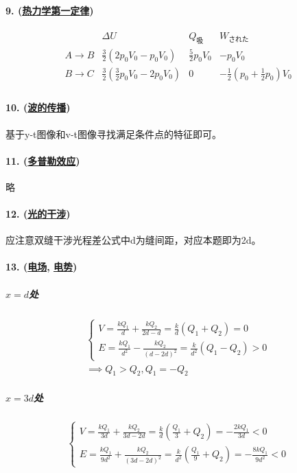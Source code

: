 \paragraph{9. (\hyperref[subsec:热力学第一定律]{热力学第一定律})}

\begin{equation*}
    \begin{array}{c|ccc}
        & \Delta U & Q_\textrm{吸} & W_\textrm{された} \\\hline
        A\to B & \frac32(2p_0V_0-p_0V_0) & \frac52p_0V_0 & -p_0V_0 \\
        B\to C & \frac32(\frac32p_0V_0-2p_0V_0) & 0 & -\frac12(p_0+\frac12p_0)V_0 \\
    \end{array}
\end{equation*}

\paragraph{10. (\hyperref[subsec:波的传播]{波的传播})} 基于y-t图像和v-t图像寻找满足条件点的特征即可。
\paragraph{11. (\hyperref[subsec:多普勒效应]{多普勒效应})} 略
\paragraph{12. (\hyperref[subsec:光的干涉]{光的干涉})} 应注意双缝干涉光程差公式中d为缝间距，对应本题即为2d。
\paragraph{13. (\hyperref[subsec:电场]{电场}, \hyperref[subsec:电势]{电势})}

\subparagraph{$x=d$处}

\begin{gather*}
    \begin{cases}
        V=\frac{kQ_1}{d}+\frac{kQ_2}{2d-d}=\frac{k}{d}(Q_1+Q_2)=0\\
        E=\frac{kQ_1}{d^2}-\frac{kQ_2}{(d-2d)^2}=\frac{k}{d^2}(Q_1-Q_2)>0
    \end{cases}\\\implies
    Q_1>Q_2,Q_1=-Q_2
\end{gather*}

\subparagraph{$x=3d$处}

\begin{equation*}
    \begin{cases}
        V=\frac{kQ_1}{3d}+\frac{kQ_2}{3d-2d}=\frac{k}{d}(\frac{Q_1}{3}+Q_2)=-\frac{2kQ_1}{3d}<0\\
        E=\frac{kQ_1}{9d^2}+\frac{kQ_2}{(3d-2d)^2}=\frac{k}{d^2}(\frac{Q_1}{9}+Q_2)=-\frac{8kQ_1}{9d^2}<0
    \end{cases}
\end{equation*}

